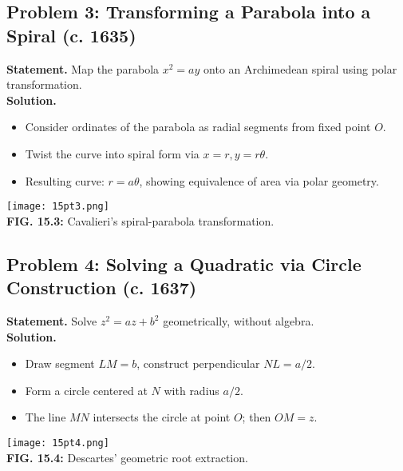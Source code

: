 \documentclass[9pt]{article}
\begin{document}
\subsection*{Problem 3: Transforming a Parabola into a Spiral (c. 1635)}
\textbf{Statement.} Map the parabola \( x^2 = ay \) onto an Archimedean spiral using polar transformation. \\
\textbf{Solution.}
\begin{itemize}
  \item Consider ordinates of the parabola as radial segments from fixed point \( O \).
  \item Twist the curve into spiral form via \( x = r, y = r\theta \).
  \item Resulting curve: \( r = a\theta \), showing equivalence of area via polar geometry.
\end{itemize}
\begin{center}
\texttt{[image: 15pt3.png]} \\
\textbf{FIG. 15.3:} Cavalieri’s spiral-parabola transformation.
\end{center}

\newpage

\subsection*{Problem 4: Solving a Quadratic via Circle Construction (c. 1637)}
\textbf{Statement.} Solve \( z^2 = az + b^2 \) geometrically, without algebra. \\
\textbf{Solution.}
\begin{itemize}
  \item Draw segment \( LM = b \), construct perpendicular \( NL = a/2 \).
  \item Form a circle centered at \( N \) with radius \( a/2 \).
  \item The line \( MN \) intersects the circle at point \( O \); then \( OM = z \).
\end{itemize}
\begin{center}
\texttt{[image: 15pt4.png]} \\
\textbf{FIG. 15.4:} Descartes’ geometric root extraction.
\end{center}

\newpage
\end{document}
